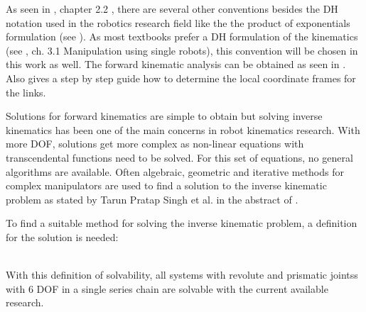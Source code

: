 As seen in 
\cite{MathIntroRobManip}, chapter 2.2
, there are several other conventions besides the \acrfull{DH} notation used in the robotics research field like the the product of exponentials formulation (see \cite{MathIntroRobManip}).
As most textbooks prefer a \ac{DH} formulation of the kinematics (see \cite{MathIntroRobManip}, ch. 3.1 Manipulation using single robots), this convention will be chosen in this work as well.
The forward kinematic analysis can be obtained as seen in %
\cite{ConstantinForwardKA}. Also \cite{DenavitHartenbergKonventionen} gives a step by step guide how to determine the local coordinate frames for the links.

Solutions for forward  kinematics are simple to obtain but solving inverse kinematics  has  been  one of  the  main  concerns  in  robot kinematics research. 
With more \ac{DOF}, solutions get more complex as non-linear equations with transcendental functions need to be solved. 
For this set of equations, no general algorithms are available.
Often algebraic, geometric and iterative methods for complex manipulators are used to find a solution to the inverse kinematic problem as stated by Tarun Pratap Singh et al. in the abstract of %
\cite{FwdInvAnalysRobManip}.

To find a suitable method for solving the inverse kinematic problem, a definition for the solution is needed:\\
\medskip
\\
\bigskip

With this definition of solvability, all systems with revolute and prismatic \glspl{joints} with 6 \ac{DOF}  in a single series chain are solvable with the current available research. \cite{invKinSeriallinkMani}
\\

